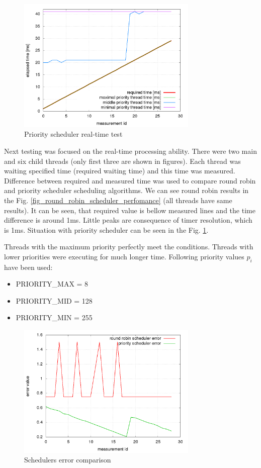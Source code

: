 \documentclass[a4paper, conference]{IEEEtran}
\begin{document}
\begin{figure}[]
\centering
\includegraphics[width=3.4in]{priority_scheduler_perfomance.png}
\caption{Priority scheduler real-time test}
\label{fig_priority_scheduler_perfomance}
\end{figure}



Next testing was focused on the real-time processing ability. There were two main and six child threads (only first three are shown in figures). Each thread was waiting specified time (required waiting time) and this time was measured. Difference between required and measured time was used to compare round robin and priority scheduler scheduling algorithms.
\balance
We can see round robin results in the Fig. \ref{fig_round_robin_scheduler_perfomance} (all threads have same results). It can be seen, that required value is bellow measured lines and the time difference is around 1ms. Little peaks are consequence of timer resolution, which is 1ms.
Situation with priority scheduler can be seen in the Fig. \ref{fig_priority_scheduler_perfomance}.




Threads with the maximum priority perfectly meet the conditions. Threads with lower priorities were executing for much longer time. Following priority values $p_i$ have been used:

\begin{itemize}
	\item PRIORITY\_MAX = 8
	\item PRIORITY\_MID = 128
	\item PRIORITY\_MIN = 255
\end{itemize}


\begin{figure}[h]
\centering
\includegraphics[width=3.4in]{scheduler_error.png}
\caption{Schedulers error comparison}
\label{fig_error}
\end{figure}
\end{document}
